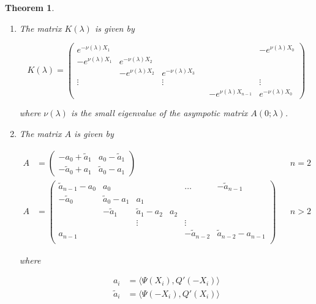\documentclass[12pt]{article}
\newtheorem{theorem}{Theorem}
\begin{document}
\begin{theorem}
\begin{enumerate}
where $w(y; 0, 0)$ is a bounded (but not exponentially decaying) solution to the (unperturbed) adjoint variational equation. If, say, we assume that the constant solution $1$ is the only such solution, this would become

\begin{equation*}
M(0) =  \int_{-\infty}^\infty q_c(y) dy
\end{equation*}

\item The matrix $K(\lambda)$ is given by

\begin{equation}\label{blockdiag}
K(\lambda) = 
\begin{pmatrix}
e^{-\nu(\lambda)X_1} & & & & & -e^{\nu(\lambda)X_0} \\
-e^{\nu(\lambda)X_1} & e^{-\nu(\lambda)X_2} \\
& -e^{\nu(\lambda)X_2} & e^{-\nu(\lambda)X_3} \\
\vdots & & \vdots & &&  \vdots \\
& & & & -e^{\nu(\lambda)X_{n-1}} & e^{-\nu(\lambda)X_0} 
\end{pmatrix}
\end{equation}

where $\nu(\lambda)$ is the small eigenvalue of the asympotic matrix $A(0; \lambda)$.

\item The matrix $A$ is given by

\begin{align*}
A &= \begin{pmatrix}
-a_0 + \tilde{a}_1 & a_0 - \tilde{a}_1 \\
-\tilde{a}_0 + a_1 & \tilde{a}_0 - a_1
\end{pmatrix} && n = 2 \\
A &= \begin{pmatrix}
\tilde{a}_{n-1} - a_0 & a_0 & & & \dots & -\tilde{a}_{n-1}\\
-\tilde{a}_0 & \tilde{a}_0 - a_1 &  a_1 \\
& -\tilde{a}_1 & \tilde{a}_1 - a_2 &  a_2 \\
& & \vdots & & \vdots \\
a_{n-1} & & & & -\tilde{a}_{n-2} & \tilde{a}_{n-2} - a_{n-1} \\
\end{pmatrix} && n > 2
\end{align*}

where

\begin{align*}
a_i &= \langle \Psi(X_i), Q'(-X_i) \rangle \\
\tilde{a}_i &= \langle \Psi(-X_i), Q'(X_i) \rangle
\end{align*}


\end{enumerate}
\end{theorem}
\end{document}
